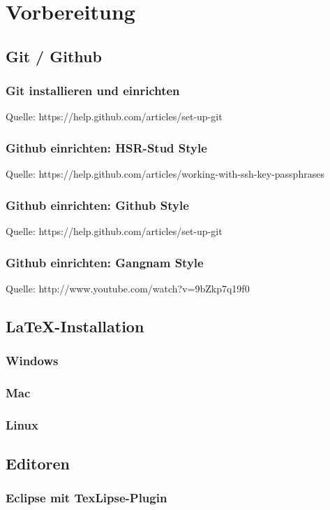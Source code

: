 \section{Vorbereitung}

\subsection{Git / Github}
\subsubsection{Git installieren und einrichten}
Quelle: https://help.github.com/articles/set-up-git
\subsubsection{Github einrichten: HSR-Stud Style}
Quelle: https://help.github.com/articles/working-with-ssh-key-passphrases
\subsubsection{Github einrichten: Github Style}
Quelle: https://help.github.com/articles/set-up-git
\subsubsection{Github einrichten: Gangnam Style}
Quelle: http://www.youtube.com/watch?v=9bZkp7q19f0 

\subsection{\LaTeX-Installation}
\subsubsection{Windows}
\subsubsection{Mac}
\subsubsection{Linux}
\subsection{Editoren}
\subsubsection{Eclipse mit TexLipse-Plugin}
